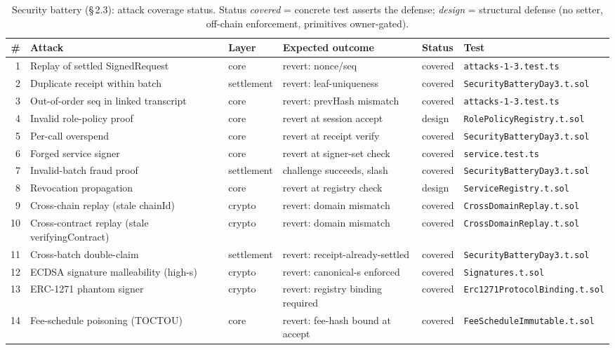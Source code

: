 \begin{table}[t]
\centering
\caption{Security battery (\S\,2.3): attack coverage status. Status \emph{covered} = concrete test asserts the defense; \emph{design} = structural defense (no setter, off-chain enforcement, primitives owner-gated).}
\label{tab:attacks}
\begin{tabular}{rlllll}
\hline
\# & Attack & Layer & Expected outcome & Status & Test \\
\hline
1 & Replay of settled SignedRequest & core & revert: nonce/seq & covered & \texttt{attacks-1-3.test.ts} \\
2 & Duplicate receipt within batch & settlement & revert: leaf-uniqueness & covered & \texttt{SecurityBatteryDay3.t.sol} \\
3 & Out-of-order seq in linked transcript & core & revert: prevHash mismatch & covered & \texttt{attacks-1-3.test.ts} \\
4 & Invalid role-policy proof & core & revert at session accept & design & \texttt{RolePolicyRegistry.t.sol} \\
5 & Per-call overspend & core & revert at receipt verify & covered & \texttt{SecurityBatteryDay3.t.sol} \\
6 & Forged service signer & core & revert at signer-set check & covered & \texttt{service.test.ts} \\
7 & Invalid-batch fraud proof & settlement & challenge succeeds, slash & covered & \texttt{SecurityBatteryDay3.t.sol} \\
8 & Revocation propagation & core & revert at registry check & design & \texttt{ServiceRegistry.t.sol} \\
9 & Cross-chain replay (stale chainId) & crypto & revert: domain mismatch & covered & \texttt{CrossDomainReplay.t.sol} \\
10 & Cross-contract replay (stale verifyingContract) & crypto & revert: domain mismatch & covered & \texttt{CrossDomainReplay.t.sol} \\
11 & Cross-batch double-claim & settlement & revert: receipt-already-settled & covered & \texttt{SecurityBatteryDay3.t.sol} \\
12 & ECDSA signature malleability (high-s) & crypto & revert: canonical-s enforced & covered & \texttt{Signatures.t.sol} \\
13 & ERC-1271 phantom signer & crypto & revert: registry binding required & covered & \texttt{Erc1271ProtocolBinding.t.sol} \\
14 & Fee-schedule poisoning (TOCTOU) & core & revert: fee-hash bound at accept & covered & \texttt{FeeScheduleImmutable.t.sol} \\

\end{tabular}
\end{table}
